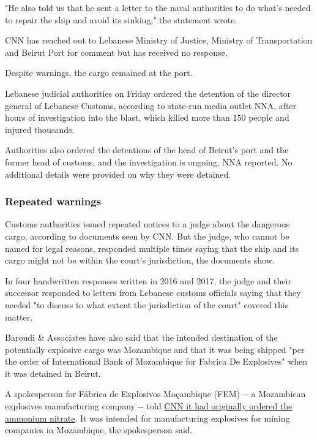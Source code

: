 "He also told us that he sent a letter to the naval authorities to do
what's needed to repair the ship and avoid its sinking," the statement
wrote.

CNN has reached out to Lebanese Ministry of Justice, Ministry of
Transportation and Beirut Port for comment but has received no response.

Despite warnings, the cargo remained at the port.

Lebanese judicial authorities on Friday ordered the detention of the
director general of Lebanese Customs, according to state-run media
outlet NNA, after hours of investigation into the blast, which killed
more than 150 people and injured thousands.

Authorities also ordered the detentions of the head of Beirut's port and
the former head of customs, and the investigation is ongoing, NNA
reported. No additional details were provided on why they were detained.

\hypertarget{repeated-warnings}{%
\subsubsection{Repeated warnings}\label{repeated-warnings}}

Customs authorities issued repeated notices to a judge about the
dangerous cargo, according to documents seen by CNN. But the judge, who
cannot be named for legal reasons, responded multiple times saying that
the ship and its cargo might not be within the court's jurisdiction, the
documents show.

In four handwritten responses written in 2016 and 2017, the judge and
their successor responded to letters from Lebanese customs officials
saying that they needed "to discuss to what extent the jurisdiction of
the court" covered this matter.

Baroudi \& Associates have also said that the intended destination of
the potentially explosive cargo was Mozambique and that it was being
shipped "per the order of International Bank of Mozambique for Fabrica
De Explosives" when it was detained in Beirut.

A spokesperson for Fábrica de Explosivos Moçambique (FEM) -\/- a
Mozambican explosives manufacturing company -\/- told
\href{https://www.cnn.com/2020/08/07/middleeast/beirut-lebanon-ammonium-nitrate-explosion/index.html}{CNN
it had originally ordered the ammonium nitrate}. It was intended for
manufacturing explosives for mining companies in Mozambique, the
spokesperson said.

